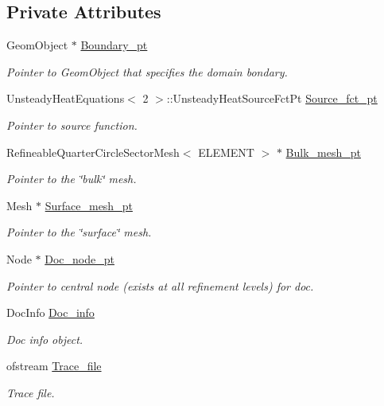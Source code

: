 \subsection*{Private Attributes}
\begin{DoxyCompactItemize}
\item 
Geom\+Object $\ast$ \hyperlink{classRefineableUnsteadyHeatProblem_a368512778fbfd59e918104340466b1df}{Boundary\+\_\+pt}
\begin{DoxyCompactList}\small\item\em Pointer to Geom\+Object that specifies the domain bondary. \end{DoxyCompactList}\item 
Unsteady\+Heat\+Equations$<$ 2 $>$\+::Unsteady\+Heat\+Source\+Fct\+Pt \hyperlink{classRefineableUnsteadyHeatProblem_a99eb5a2cd4b680b4f83e739bd4e16639}{Source\+\_\+fct\+\_\+pt}
\begin{DoxyCompactList}\small\item\em Pointer to source function. \end{DoxyCompactList}\item 
Refineable\+Quarter\+Circle\+Sector\+Mesh$<$ E\+L\+E\+M\+E\+NT $>$ $\ast$ \hyperlink{classRefineableUnsteadyHeatProblem_afade341e03a4c97e62444c80adc9552f}{Bulk\+\_\+mesh\+\_\+pt}
\begin{DoxyCompactList}\small\item\em Pointer to the \char`\"{}bulk\char`\"{} mesh. \end{DoxyCompactList}\item 
Mesh $\ast$ \hyperlink{classRefineableUnsteadyHeatProblem_a2febbb317a74e427bf6304235d779fe6}{Surface\+\_\+mesh\+\_\+pt}
\begin{DoxyCompactList}\small\item\em Pointer to the \char`\"{}surface\char`\"{} mesh. \end{DoxyCompactList}\item 
Node $\ast$ \hyperlink{classRefineableUnsteadyHeatProblem_a7ff1982af5819bab492c693178be0c24}{Doc\+\_\+node\+\_\+pt}
\begin{DoxyCompactList}\small\item\em Pointer to central node (exists at all refinement levels) for doc. \end{DoxyCompactList}\item 
Doc\+Info \hyperlink{classRefineableUnsteadyHeatProblem_a9ea9d79a57cb16a6292a637965767f7e}{Doc\+\_\+info}
\begin{DoxyCompactList}\small\item\em Doc info object. \end{DoxyCompactList}\item 
ofstream \hyperlink{classRefineableUnsteadyHeatProblem_a8f62ba78fb856d2e07b00254ca7a0e6a}{Trace\+\_\+file}
\begin{DoxyCompactList}\small\item\em Trace file. \end{DoxyCompactList}\end{DoxyCompactItemize}


